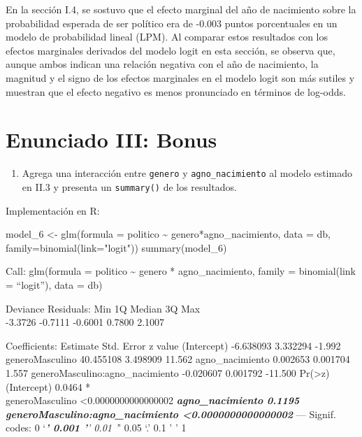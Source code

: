 \documentclass[
  12pt,
  a4paper,
]{article}
\newenvironment{Shaded}{\begin{snugshade}}{\end{snugshade}}
\newcommand{\AttributeTok}[1]{\textcolor[rgb]{0.77,0.63,0.00}{#1}}
\newcommand{\FunctionTok}[1]{\textcolor[rgb]{0.00,0.00,0.00}{#1}}
\newcommand{\NormalTok}[1]{#1}
\newcommand{\OtherTok}[1]{\textcolor[rgb]{0.56,0.35,0.01}{#1}}
\newcommand{\SpecialCharTok}[1]{\textcolor[rgb]{0.00,0.00,0.00}{#1}}
\newcommand{\StringTok}[1]{\textcolor[rgb]{0.31,0.60,0.02}{#1}}
\providecommand{\tightlist}{%
  \setlength{\itemsep}{0pt}\setlength{\parskip}{0pt}}
\begin{document}
En la sección I.4, se sostuvo que el efecto marginal del año de nacimiento sobre la probabilidad esperada de ser político era de -0.003 puntos porcentuales en un modelo de probabilidad lineal (LPM). Al comparar estos resultados con los efectos marginales derivados del modelo logit en esta sección, se observa que, aunque ambos indican una relación negativa con el año de nacimiento, la magnitud y el signo de los efectos marginales en el modelo logit son más sutiles y muestran que el efecto negativo es menos pronunciado en términos de log-odds.

\hypertarget{enunciado-iii-bonus}{%
\section{Enunciado III: Bonus}\label{enunciado-iii-bonus}}

\begin{enumerate}
\def\labelenumi{\arabic{enumi}.}
\tightlist
\item
  Agrega una interacción entre \texttt{genero} y \texttt{agno\_nacimiento} al modelo estimado en II.3 y presenta un \texttt{summary()} de los resultados.
\end{enumerate}

Implementación en R:

\begin{Shaded}
\begin{Highlighting}[]
\NormalTok{model\_6 }\OtherTok{\textless{}{-}} \FunctionTok{glm}\NormalTok{(}\AttributeTok{formula =}\NormalTok{ politico }\SpecialCharTok{\textasciitilde{}}\NormalTok{ genero}\SpecialCharTok{*}\NormalTok{agno\_nacimiento, }
               \AttributeTok{data =}\NormalTok{ db, }\AttributeTok{family=}\FunctionTok{binomial}\NormalTok{(}\AttributeTok{link=}\StringTok{"logit"}\NormalTok{))}
\FunctionTok{summary}\NormalTok{(model\_6)}
\end{Highlighting}
\end{Shaded}

Call:
glm(formula = politico \textasciitilde{} genero * agno\_nacimiento, family = binomial(link = ``logit''),
data = db)

Deviance Residuals:
Min 1Q Median 3Q Max\\
-3.3726 -0.7111 -0.6001 0.7800 2.1007

Coefficients:
Estimate Std. Error z value
(Intercept) -6.638093 3.332294 -1.992
generoMasculino 40.455108 3.498909 11.562
agno\_nacimiento 0.002653 0.001704 1.557
generoMasculino:agno\_nacimiento -0.020607 0.001792 -11.500
Pr(\textgreater\textbar z\textbar)\\
(Intercept) 0.0464 *\\
generoMasculino \textless0.0000000000000002 \textbf{\emph{
agno\_nacimiento 0.1195\\
generoMasculino:agno\_nacimiento \textless0.0000000000000002 }}
---
Signif. codes: 0 `\emph{\textbf{' 0.001 '}' 0.01 '}' 0.05 `.' 0.1 ' ' 1
\end{document}

